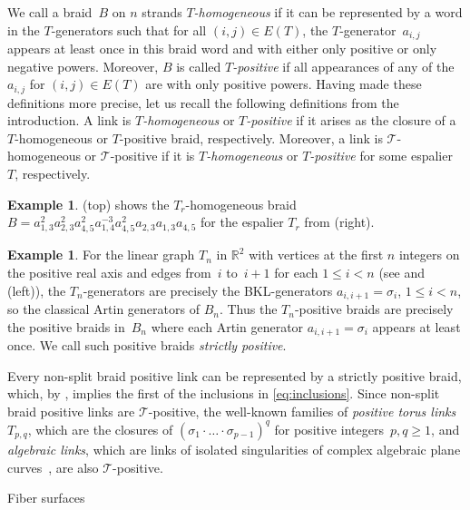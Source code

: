 \documentclass{amsart}
\makeatletter
\renewcommand\subsection{\@startsection{subsection}{2}%
  \z@{-.5\linespacing\@plus-.7\linespacing}{.5\linespacing}%
  {\normalfont\scshape}}
\theoremstyle{definition}
\newtheorem{example}[definition]{Example}
\theoremstyle{remark}
\theoremstyle{plain}
\newcommand{\R}{\mathbb{R}}
\newcommand{\T}{\mathcal{T}}
\newcommand{\sigij}{a_{i,j}}
\makeatother
\begin{document}
We call a braid~$B$ on $n$ strands \emph{$T$-homogeneous} if it can be represented by a word in the $T$-generators such that for all $(i,j) \in E(T)$, the $T$-generator~$\sigij$ appears at least once in this braid word and with either only positive or only negative powers. Moreover, $B$ is called \emph{$T$-positive} if all appearances of any of the $\sigij$ for $(i,j) \in E(T)$ are with only positive powers. Having made these definitions more precise, let us recall the following definitions from the introduction. A link is \emph{$T$-homogeneous} or \emph{$T$-positive} if it arises as the closure of a $T$-homogeneous or $T$-positive braid, respectively. Moreover, a link is $\T$-homogeneous or $\T$-positive if it is \emph{$T$-homogeneous} or \emph{$T$-positive} for some espalier~$T$, respectively. 

\begin{example}
     (top) shows the $T_r$-homogeneous braid $B = a_{1,3}^2 a_{2,3}^2 a_{4,5}^2 a_{1,4}^{-3} a_{4,5}^2 a_{2,3} a_{1,3} a_{4,5}$ for the espalier $T_r$ from  (right). 
\end{example}

\begin{example}\label{ex:bp_T_n}
For the linear graph $T_n$ in $\R^2$ with vertices at the first $n$ integers on the positive real axis and edges from~$i$ to~$i+1$ for each $1 \leq i < n$ (see  and  (left)), the $T_n$-generators are precisely the BKL-generators $a_{i,i+1}=\sigma_i$, $1 \leq i < n$, so the classical Artin generators of $B_n$. Thus the $T_n$-positive braids are precisely the positive braids in~$B_n$ where each Artin generator $a_{i,i+1}=\sigma_i$ appears at least once. We call such positive braids \emph{strictly positive}. 
\end{example}

Every non-split braid positive link can be represented by a strictly positive braid, which, by , implies the first of the inclusions in \eqref{eq:inclusions}. Since non-split braid positive links are $\mathcal{T}$-positive, the well-known families of \emph{positive torus links}~$T_{p,q}$, which are the closures of $(\sigma_1 \cdot \ldots \cdot \sigma_{p-1})^q$ for positive integers~$p, q \geq 1$, and \emph{algebraic links}, which are links of isolated singularities of complex algebraic plane curves~\cite{milnor_book}, are also $\mathcal{T}$-positive. 

\subsection{Fiber surfaces}\label{fiber_surf}
\end{document}
